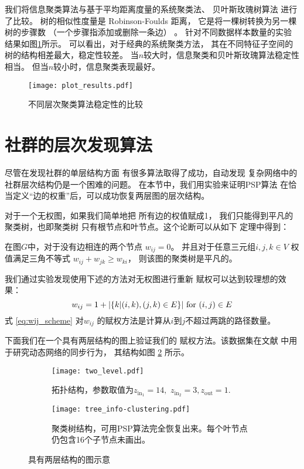 我们将信息聚类算法与基于平均距离度量的系统聚类法、
贝叶斯玫瑰树算法
\cite{blundell2011discovering}
进行了比较。
树的相似性度量是 Robinson-Foulds 距离，
它是将一棵树转换为另一棵树的步骤数
（一个步骤指添加或删除一条边）
\citep{day1985optimal}。
针对不同数据样本数量的实验
结果如图\ref{fig:shc}所示。
可以看出，对于经典的系统聚类方法，
其在不同特征子空间的树的结构相差最大，稳定性较差。
当$n$较大时，信息聚类和贝叶斯玫瑰算法稳定性相当。
但当$n$较小时，信息聚类表现最好。

\begin{figure}[!ht]
\centering
\texttt{[image: plot\_results.pdf]}
\caption{不同层次聚类算法稳定性的比较}\label{fig:shc}
\end{figure}

\section{社群的层次发现算法}
\label{subsec:cd}
尽管在发现社群的单层结构方面
有很多算法取得了成功，自动发现
复杂网络中的社群层次结构仍是一个困难的问题。
在本节中，我们用实验来证明PSP算法
在恰当定义“边的权重”后，可以成功恢复两层图的层次结构。

对于一个无权图，如果我们简单地把
所有边的权值赋成1，
我们只能得到平凡的聚类树，也即聚类树
只有根节点和叶节点。这个论断可以从如下
定理中得到：
\begin{theorem}\label{thm:triangle}
  在图$G$中，对于没有边相连的两个节点 $w_{ij}=0$。
  并且对于任意三元组$i,j,k \in V$ 权值满足三角不等式 
  $w_{ij} + w_{jk} \geq w_{ki}$，
  则该图的聚类树是平凡的。
\end{theorem}
  
我们通过实验发现使用下述的方法对无权图进行重新
赋权可以达到较理想的效果：
\begin{equation}\label{eq:wij_scheme}
    w_{ij} = 1 + \lvert\{k | (i,k),(j,k) \in E \}\rvert \textrm{ for } (i,j) \in E
\end{equation}
式 \ref{eq:wij_scheme} 对$w_{ij}$
的赋权方法是计算从$i$到$j$不超过两跳的路径数量。

下面我们在一个具有两层结构的图上验证我们的
赋权方法。该数据集在文献
\cite{RN22} 中用于研究动态网络的同步行为，
其结构如图 \ref{fig:c1} 所示。 

\begin{figure}
	\centering
	\begin{subfigure}{0.45\textwidth}
		\texttt{[image: two\_level.pdf]}
		\caption{拓扑结构，参数取值为$z_{\mathrm{in}_1} = 14,$ $z_{\mathrm{in}_2} = 3, z_{\mathrm{out}}=1$.}\label{fig:c1}
	\end{subfigure}
	\begin{subfigure}{0.45\textwidth}
		\texttt{[image: tree\_info-clustering.pdf]}
		\caption{聚类树结构，可用PSP算法完全恢复出来。每个叶节点仍包含16个子节点未画出。}
    \label{fig:c2}
	\end{subfigure}
	\caption{具有两层结构的图示意}
\end{figure}

